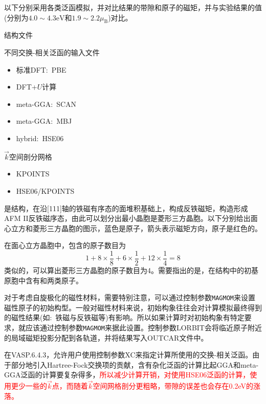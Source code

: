 {以下分别采用各类泛函模拟，并对比结果的带隙和原子的磁矩，并与实验结果的值(分别为$4.0\sim4.3\mathrm{eV}$和$1.9\sim2.2\mu_{\mathrm{B}}$)对比。

结构文件

不同交换-相关泛函的输入文件
\begin{itemize}
	\item 标准\textrm{DFT}:~\textrm{PBE}
	\item \textrm{DFT}+$U$计算
	\item \textrm{meta-GGA}:~\textrm{SCAN}
	\item \textrm{meta-GGA}:~\textrm{MBJ}
	\item \textrm{hybrid}:~\textrm{HSE06}
\end{itemize}

$\vec k$空间剖分网格
\begin{itemize}
	\item \textrm{KPOINTS}
	\item \textrm{HSE06/KPOINTS}
\end{itemize}

是结构，在沿[111]轴的铁磁有序态的面堆积基础上，构成反铁磁矩，构造形成\textrm{AFM II}反铁磁序态，由此可以划分出最小晶胞是菱形三方晶胞。以下分别给出面心立方和菱形三方晶胞的图示，蓝色是原子，箭头表示磁矩方向，原子是红色的。

在面心立方晶胞中，包含的原子数目为
\begin{displaymath}
	1+8\times\dfrac18+6\times\dfrac12+12\times\dfrac14=8
\end{displaymath}
类似的，可以算出菱形三方晶胞的原子数目为4。需要指出的是，在结构中的初基原胞中含有和两类原子。

对于考虑自旋极化的磁性材料，需要特别注意，可以通过控制参数\texttt{MAGMOM}来设置磁性原子的初始构型。一般对磁性材料来说，初始构象往往会对计算模拟最终得到的磁性结果(如:~铁磁与反铁磁等)有影响。所以如果计算时对初始构象有特定要求，就应该通过控制参数\texttt{MAGMOM}来据此设置。控制参数\textrm{LORBIT}会将临近原子附近的局域磁矩投影分配到各轨道，并将结果写入\textrm{OUTCAR}文件中。

在\textrm{VASP.6.4.3}，允许用户使用控制参数\textrm{XC}来指定计算所使用的交换-相关泛函。由于部分地引入\textrm{Hartree-Fock}交换项的贡献，含有杂化泛函的计算比起\textrm{GGA}和\textrm{meta-GGA}泛函的计算要复杂得多，\textcolor{red}{所以减少计算开销，对使用\textrm{HSE06}泛函的计算，使用更少一些的$\vec k$点，而随着$\vec k$空间网格剖分更粗略，带隙的误差也会存在0.2\textrm{eV}的涨落。}

}
